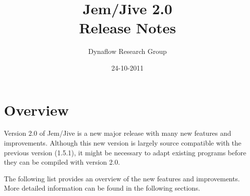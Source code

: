 \documentclass[a4paper]{article}
\title {Jem/Jive 2.0\\[1ex]
        Release Notes}
\author{Dynaflow Research Group}
\date  {24-10-2011}
\begin{document}
\maketitle

\section{Overview}

Version 2.0 of Jem/Jive is a new major release with many new features and
improvements. Although this new version is largely source compatible with
the previous version (1.5.1), it might be necessary to adapt existing
programs before they can be compiled with version 2.0.

The following list provides an overview of the new features and
improvements. More detailed information can be found in the following
sections.
\end{document}
